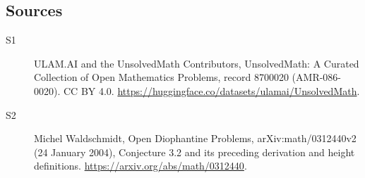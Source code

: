 \documentclass[11pt]{article}
\begin{document}
\subsection{Sources}
\begin{description}
\item[\hypertarget{source:8700020:1}{S1}] ULAM.AI and the UnsolvedMath Contributors, UnsolvedMath: A Curated Collection of Open Mathematics Problems, record 8700020 (AMR-086-0020). CC BY 4.0. \url{https://huggingface.co/datasets/ulamai/UnsolvedMath}.
\item[\hypertarget{source:8700020:2}{S2}] Michel Waldschmidt, Open Diophantine Problems, arXiv:math/0312440v2 (24 January 2004), Conjecture 3.2 and its preceding derivation and height definitions. \url{https://arxiv.org/abs/math/0312440}.
\end{description}
\label{end:8700020}
\end{document}
